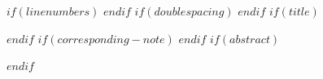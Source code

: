 $if(linenumbers)$
\linenumbers
$endif$
$if(doublespacing)$
\doublespacing
$endif$
$if(title)$
\maketitle

$endif$
$if(corresponding-note)$
\makeatletter
\ifdefvoid{\@corrauthor}{}{%
  \begingroup
  \renewcommand{\thefootnote}{}%
  \footnotetext{\emph{\@corrauthorname:} \@corrauthor}%
  \endgroup}
\makeatother
$endif$
$if(abstract)$
\begin{abstract}
$abstract$

$if(keywords)$
$endif$
\end{abstract}
$endif$
